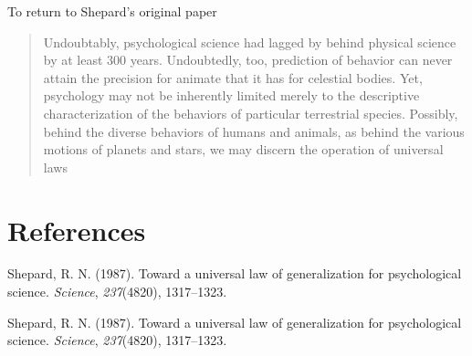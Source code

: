 \documentclass[jnl]{apa6}
\begin{document}
To return to Shepard's original paper

\begin{quote}
Undoubtably, psychological science had lagged by behind physical science by at least 300 years. Undoubtedly, too, prediction of behavior can never attain the precision for animate that it has for celestial bodies. Yet, psychology may not be inherently limited merely to the descriptive characterization of the behaviors of particular terrestrial species. Possibly, behind the diverse behaviors of humans and animals, as behind the various motions of planets and stars, we may discern the operation of universal laws
\end{quote}

\hypertarget{references}{%
\section{References}\label{references}}

\begingroup
\setlength{\parindent}{-0.5in}
\setlength{\leftskip}{0.5in}

\hypertarget{refs}{}
\leavevmode\hypertarget{ref-shepard1987toward}{}%
Shepard, R. N. (1987). Toward a universal law of generalization for psychological science. \emph{Science}, \emph{237}(4820), 1317--1323.

\leavevmode\hypertarget{ref-shepard1987toward}{}%
Shepard, R. N. (1987). Toward a universal law of generalization for psychological science. \emph{Science}, \emph{237}(4820), 1317--1323.

\endgroup
\end{document}
